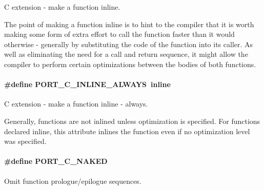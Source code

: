 C extension -\/ make a function inline. 

The point of making a function {\ttfamily inline} is to hint to the compiler that it is worth making some form of extra effort to call the function faster than it would otherwise -\/ generally by substituting the code of the function into its caller. As well as eliminating the need for a call and return sequence, it might allow the compiler to perform certain optimizations between the bodies of both functions. \hypertarget{group__template__compiler_ga89152d5aab4045f552113b32920741ce}{
\paragraph[{P\-O\-R\-T\-\_\-\-C\-\_\-\-I\-N\-L\-I\-N\-E\-\_\-\-A\-L\-W\-A\-Y\-S}]{\setlength{\rightskip}{0pt plus 5cm}\#define P\-O\-R\-T\-\_\-\-C\-\_\-\-I\-N\-L\-I\-N\-E\-\_\-\-A\-L\-W\-A\-Y\-S~inline}}\label{group__template__compiler_ga89152d5aab4045f552113b32920741ce}


C extension -\/ make a function inline -\/ always. 

Generally, functions are not inlined unless optimization is specified. For functions declared inline, this attribute inlines the function even if no optimization level was specified. \hypertarget{group__template__compiler_gaf50b092bb255c796c99927cebbdb8631}{
\paragraph[{P\-O\-R\-T\-\_\-\-C\-\_\-\-N\-A\-K\-E\-D}]{\setlength{\rightskip}{0pt plus 5cm}\#define P\-O\-R\-T\-\_\-\-C\-\_\-\-N\-A\-K\-E\-D}}\label{group__template__compiler_gaf50b092bb255c796c99927cebbdb8631}


Omit function prologue/epilogue sequences. 

